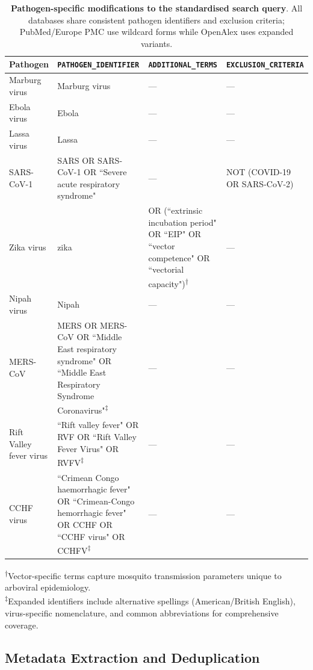 \begin{table}[h]
\footnotesize
\caption{\textbf{Pathogen-specific modifications to the standardised search query}. All databases share consistent pathogen identifiers and exclusion criteria; PubMed/Europe PMC use wildcard forms while OpenAlex uses expanded variants.}
\label{tab:search_queries}
\begin{center}
\begin{tabular}{lp{5cm}p{3.2cm}p{3.5cm}}
\toprule
\textbf{Pathogen} & \textbf{\texttt{PATHOGEN\_IDENTIFIER}} & \textbf{\texttt{ADDITIONAL\_TERMS}} & \textbf{\texttt{EXCLUSION\_CRITERIA}} \\
\midrule
Marburg virus & Marburg virus & --- & --- \\
Ebola virus & Ebola & --- & --- \\
Lassa virus & Lassa & --- & --- \\
SARS-CoV-1 & SARS OR SARS-CoV-1 OR ``Severe acute respiratory syndrome" & --- & NOT (COVID-19 OR SARS-CoV-2) \\
Zika virus & zika & OR (``extrinsic incubation period" OR ``EIP" OR ``vector competence" OR ``vectorial capacity")\textsuperscript{†} & --- \\
Nipah virus & Nipah & --- & --- \\
MERS-CoV & MERS OR MERS-CoV OR ``Middle East respiratory syndrome" OR ``Middle East Respiratory Syndrome Coronavirus"\textsuperscript{‡} & --- & --- \\
Rift Valley fever virus & ``Rift valley fever" OR RVF OR ``Rift Valley Fever Virus" OR RVFV\textsuperscript{‡} & --- & --- \\
CCHF virus & ``Crimean Congo haemorrhagic fever" OR ``Crimean-Congo hemorrhagic fever" OR CCHF OR ``CCHF virus" OR CCHFV\textsuperscript{‡} & --- & --- \\
\bottomrule
\end{tabular}
\end{center}
\vspace{-2mm}
{\small \textsuperscript{†}Vector-specific terms capture mosquito transmission parameters unique to arboviral epidemiology.}\\
{\small \textsuperscript{‡}Expanded identifiers include alternative spellings (American/British English), virus-specific nomenclature, and common abbreviations for comprehensive coverage.}
\end{table}

\subsection{Metadata Extraction and Deduplication}

